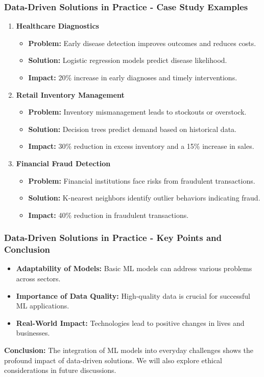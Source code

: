 \documentclass[aspectratio=169]{beamer}
\begin{document}
\begin{frame}[fragile]
    \frametitle{Data-Driven Solutions in Practice - Case Study Examples}
    \begin{enumerate}
        \item \textbf{Healthcare Diagnostics}
            \begin{itemize}
                \item \textbf{Problem:} Early disease detection improves outcomes and reduces costs.
                \item \textbf{Solution:} Logistic regression models predict disease likelihood.
                \item \textbf{Impact:} 20\% increase in early diagnoses and timely interventions.
            \end{itemize}
        \item \textbf{Retail Inventory Management}
            \begin{itemize}
                \item \textbf{Problem:} Inventory mismanagement leads to stockouts or overstock.
                \item \textbf{Solution:} Decision trees predict demand based on historical data.
                \item \textbf{Impact:} 30\% reduction in excess inventory and a 15\% increase in sales.
            \end{itemize}
        \item \textbf{Financial Fraud Detection}
            \begin{itemize}
                \item \textbf{Problem:} Financial institutions face risks from fraudulent transactions.
                \item \textbf{Solution:} K-nearest neighbors identify outlier behaviors indicating fraud.
                \item \textbf{Impact:} 40\% reduction in fraudulent transactions.
            \end{itemize}
    \end{enumerate}
\end{frame}

\begin{frame}[fragile]
    \frametitle{Data-Driven Solutions in Practice - Key Points and Conclusion}
    \begin{itemize}
        \item \textbf{Adaptability of Models:} Basic ML models can address various problems across sectors.
        \item \textbf{Importance of Data Quality:} High-quality data is crucial for successful ML applications.
        \item \textbf{Real-World Impact:} Technologies lead to positive changes in lives and businesses.
    \end{itemize}
    
    \textbf{Conclusion:} The integration of ML models into everyday challenges shows the profound impact of data-driven solutions. We will also explore ethical considerations in future discussions.
\end{frame}
\end{document}
